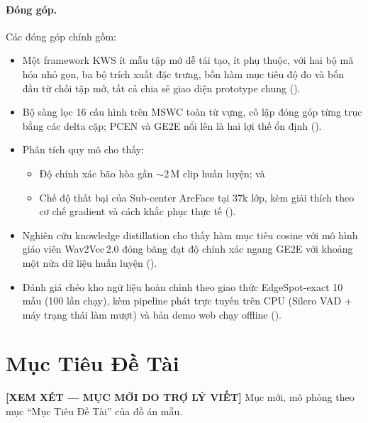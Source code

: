 \documentclass[12pt,a4paper]{report}
\newcommand{\reviewnote}[1]{%
    \par\smallskip\noindent
    \colorbox{yellow!35}{\parbox{0.97\linewidth}{\small\textbf{[XEM XÉT — MỤC MỚI DO TRỢ LÝ VIẾT]}\; #1}}%
    \par\smallskip}
\newcommand{\reviewnote}[1]{}
\begin{document}
\paragraph{Đóng góp.} Các đóng góp chính gồm:
\begin{itemize}[leftmargin=1.4em,itemsep=2pt]
\item Một framework KWS ít mẫu tập mở dễ tái tạo, ít phụ thuộc, với hai bộ mã
hóa nhỏ gọn, ba bộ trích xuất đặc trưng, bốn hàm mục tiêu độ đo và bốn đầu từ
chối tập mở, tất cả chia sẻ giao diện prototype chung ().
\item Bộ sàng lọc 16 cấu hình trên MSWC toàn từ vựng, cô lập đóng góp từng trục
bằng các delta cặp; PCEN và GE2E nổi lên là hai lợi thế ổn định
().
\item Phân tích quy mô cho thấy:
\begin{itemize}[leftmargin=1.3em,itemsep=1pt]
\item Độ chính xác bão hòa gần $\sim$2\,M clip huấn luyện; và
\item Chế độ thất bại của Sub-center ArcFace tại $37$k lớp, kèm giải thích theo
cơ chế gradient và cách khắc phục thực tế ().
\end{itemize}
\item Nghiên cứu knowledge distillation cho thấy hàm mục tiêu cosine với mô hình
giáo viên Wav2Vec\,2.0 đóng băng đạt độ chính xác ngang GE2E với khoảng một nửa
dữ liệu huấn luyện ().
\item Đánh giá chéo kho ngữ liệu hoàn chỉnh theo giao thức EdgeSpot-exact 10
mẫu (100 lần chạy), kèm pipeline phát trực tuyến trên CPU (Silero VAD + máy
trạng thái làm mượt) và bản demo web chạy offline ().
\end{itemize}

\section{Mục Tiêu Đề Tài}\label{sec:objectives}
\reviewnote{Mục mới, mô phỏng theo mục ``Mục Tiêu Đề Tài'' của đồ án mẫu.}
\end{document}
